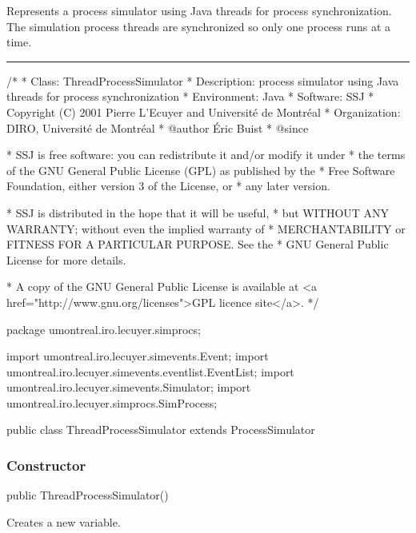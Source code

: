 
Represents a process simulator using Java threads for process synchronization.
The simulation process threads are synchronized so only one process runs
at a time.

\bigskip\hrule

\begin{code}
\begin{hide}
/*
 * Class:        ThreadProcessSimulator
 * Description:  process simulator using Java threads for process synchronization
 * Environment:  Java
 * Software:     SSJ 
 * Copyright (C) 2001  Pierre L'Ecuyer and Université de Montréal
 * Organization: DIRO, Université de Montréal
 * @author       Éric Buist
 * @since

 * SSJ is free software: you can redistribute it and/or modify it under
 * the terms of the GNU General Public License (GPL) as published by the
 * Free Software Foundation, either version 3 of the License, or
 * any later version.

 * SSJ is distributed in the hope that it will be useful,
 * but WITHOUT ANY WARRANTY; without even the implied warranty of
 * MERCHANTABILITY or FITNESS FOR A PARTICULAR PURPOSE.  See the
 * GNU General Public License for more details.

 * A copy of the GNU General Public License is available at
   <a href="http://www.gnu.org/licenses">GPL licence site</a>.
 */
\end{hide}
package umontreal.iro.lecuyer.simprocs;\begin{hide}

import umontreal.iro.lecuyer.simevents.Event;
import umontreal.iro.lecuyer.simevents.eventlist.EventList;
import umontreal.iro.lecuyer.simevents.Simulator;
import umontreal.iro.lecuyer.simprocs.SimProcess;\end{hide}

public class ThreadProcessSimulator extends ProcessSimulator \begin{hide} {

   private SimThread threadAllHead = null;
   //Tete de la liste des SimThread associated to this ThreadProcessSimulator
\end{hide}
\end{code}

\subsubsection* {Constructor}
\begin{code}
   public ThreadProcessSimulator() \begin{hide} {
   }\end{hide}
\end{code}
\begin{tabb}   Creates a new  variable.
  \end{tabb}

